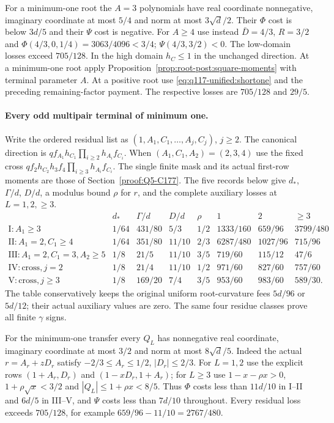 For a minimum-one root the $A=3$ polynomials have
real coordinate nonnegative, imaginary coordinate at most $5/4$
and norm at most $3\sqrt d/2$. Their $\Phi$ cost is below $3d/5$
and their $\Psi$ cost is negative. For $A\ge4$ use instead
$\bar D=4/3$, $R=3/2$ and
$\Phi(4/3,0,1/4)=3063/4096<3/4$;
$\Psi(4/3,3/2)<0$. The low-domain losses exceed $705/128$.
In the high domain $h_C\le1$ in the unchanged direction.
At a minimum-one root apply
Proposition~\ref{prop:root-post:square-moments} with terminal
parameter $A$. At a positive root use
\eqref{eq:q117-unified:shortone} and the preceding remaining-factor
payment. The respective losses are $705/128$ and $29/5$.

\paragraph{Every odd multipair terminal of minimum one.}
Write the ordered residual list as
$(1,A_1,C_1,\ldots,A_j,C_j)$, $j\ge2$.
The canonical direction is $qf_{A_1}h_{C_1}\prod_{i\ge2}h_{A_i}f_{C_i}$.
When $(A_1,C_1,A_2)=(2,3,4)$ use the fixed cross
$qf_2h_{C_2}h_3f_4\prod_{i\ge3}h_{A_i}f_{C_i}$.
The single finite mask and its actual first-row moments are those
of Section~\ref{proof:Q5-C177}. The five records below give
$d_*$, $\Gamma/d$, $D/d$, a modulus bound $\rho$ for $r$,
and the complete auxiliary losses at $L=1,2,\ge3$.
\[
\begin{array}{c|c|c|c|c|ccc}
 &d_*&\Gamma/d&D/d&\rho&1&2&\ge3\\\hline
 \mathrm I:A_1\ge3&1/64&431/80&5/3&1/2&1333/160&659/96&3799/480\\
 \mathrm {II}:A_1=2,C_1\ge4&1/64&351/80&11/10&2/3&6287/480&1027/96&715/96\\
 \mathrm {III}:A_1=2,C_1=3,A_2\ge5&1/8&21/5&11/10&3/5&719/60&115/12&47/6\\
 \mathrm {IV}:\text{cross},j=2&1/8&21/4&11/10&1/2&971/60&827/60&757/60\\
 \mathrm V:\text{cross},j\ge3&1/8&169/20&7/4&3/5&953/60&983/60&589/30.
\end{array}
\]
The table conservatively keeps the original uniform root-curvature
fees $5d/96$ or $5d/12$; their actual auxiliary values are zero.
The same four residue classes prove all finite $\gamma$ signs.

For the minimum-one transfer every $Q_L$ has nonnegative real
coordinate, imaginary coordinate at most $3/2$ and norm at most
$8\sqrt d/5$. Indeed the actual $r=A_r+zD_r$ satisfy
$-2/3\le A_r\le1/2$, $|D_r|\le2/3$.
For $L=1,2$ use the explicit rows $(1+A_r,D_r)$ and
$(1-xD_r,1+A_r)$; for $L\ge3$ use
$1-x-\rho x>0$, $1+\rho\sqrt x<3/2$ and
$|Q_L|\le1+\rho x<8/5$. Thus $\Phi$ costs less than
$11d/10$ in I--II and $6d/5$ in III--V, and $\Psi$ costs
less than $7d/10$ throughout. Every residual loss exceeds
$705/128$, for example $659/96-11/10=2767/480$.


